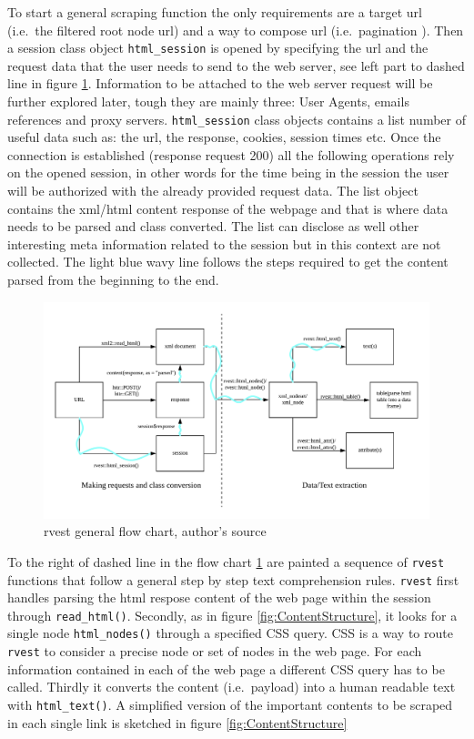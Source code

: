 \documentclass[
  12pt,
  a4paper,
  oneside]{book}
\theoremstyle{definition}
\theoremstyle{definition}
\theoremstyle{definition}
\theoremstyle{remark}
\begin{document}
To start a general scraping function the only requirements are a target url (i.e.~the filtered root node url) and a way to compose url (i.e.~pagination ). Then a session class object \texttt{html\_session} is opened by specifying the url and the request data that the user needs to send to the web server, see left part to dashed line in figure \ref{fig:workflow}. Information to be attached to the web server request will be further explored later, tough they are mainly three: User Agents, emails references and proxy servers. \texttt{html\_session} class objects contains a list number of useful data such as: the url, the response, cookies, session times etc. Once the connection is established (response request 200) all the following operations rely on the opened session, in other words for the time being in the session the user will be authorized with the already provided request data. The list object contains the xml/html content response of the webpage and that is where data needs to be parsed and class converted. The list can disclose as well other interesting meta information related to the session but in this context are not collected. The light blue wavy line follows the steps required to get the content parsed from the beginning to the end.

\begin{figure}
\centering
\includegraphics{images/workflow.png}
\caption{\label{fig:workflow}rvest general flow chart, author's source}
\end{figure}

To the right of dashed line in the flow chart \ref{fig:workflow} are painted a sequence of \texttt{rvest}\citep{rvest} functions that follow a general step by step text comprehension rules. \texttt{rvest} first handles parsing the html respose content of the web page within the session through \texttt{read\_html()}. Secondly, as in figure \ref{fig:ContentStructure}, it looks for a single node \texttt{html\_nodes()} through a specified CSS query. CSS is a way to route \texttt{rvest} to consider a precise node or set of nodes in the web page. For each information contained in each of the web page a different CSS query has to be called.
Thirdly it converts the content (i.e.~payload) into a human readable text with \texttt{html\_text()}. A simplified version of the important contents to be scraped in each single link is sketched in figure \ref{fig:ContentStructure}
\end{document}

